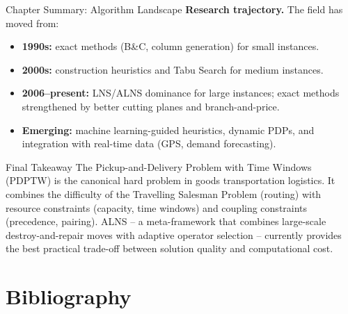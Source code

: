 \documentclass[aspectratio=169,10pt]{beamer}
\begin{document}
\begin{frame}[allowframebreaks]{Chapter Summary: Algorithm Landscape}
  \textbf{Research trajectory.}  The field has moved from:
  \begin{itemize}
    \item \textbf{1990s:} exact methods (B\&C, column generation) for small instances.
    \item \textbf{2000s:} construction heuristics and Tabu Search for medium instances.
    \item \textbf{2006--present:} LNS/ALNS dominance for large instances; exact methods
          strengthened by better cutting planes and branch-and-price.
    \item \textbf{Emerging:} machine learning-guided heuristics, dynamic PDPs, and
          integration with real-time data (GPS, demand forecasting).
  \end{itemize}

  \begin{alertblock}{Final Takeaway}
    The Pickup-and-Delivery Problem with Time Windows (PDPTW) is the canonical hard
    problem in goods transportation logistics. It combines the difficulty of the Travelling
    Salesman Problem (routing) with resource constraints (capacity, time windows) and
    coupling constraints (precedence, pairing). ALNS -- a meta-framework that combines
    large-scale destroy-and-repair moves with adaptive operator selection -- currently
    provides the best practical trade-off between solution quality and computational cost.
  \end{alertblock}

\end{frame}

\section{Bibliography}
\end{document}
